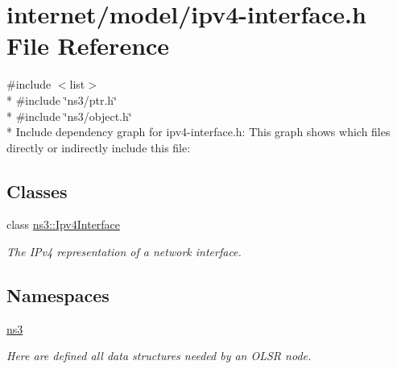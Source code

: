 \hypertarget{ipv4-interface_8h}{}\section{internet/model/ipv4-\/interface.h File Reference}
\label{ipv4-interface_8h}
{\ttfamily \#include $<$list$>$}\\*
{\ttfamily \#include \char`\"{}ns3/ptr.\+h\char`\"{}}\\*
{\ttfamily \#include \char`\"{}ns3/object.\+h\char`\"{}}\\*
Include dependency graph for ipv4-\/interface.h\+:
This graph shows which files directly or indirectly include this file\+:
\subsection*{Classes}
\begin{DoxyCompactItemize}
\item 
class \hyperlink{classns3_1_1Ipv4Interface}{ns3\+::\+Ipv4\+Interface}
\begin{DoxyCompactList}\small\item\em The I\+Pv4 representation of a network interface. \end{DoxyCompactList}\end{DoxyCompactItemize}
\subsection*{Namespaces}
\begin{DoxyCompactItemize}
\item 
 \hyperlink{namespacens3}{ns3}
\begin{DoxyCompactList}\small\item\em Here are defined all data structures needed by an O\+L\+SR node. \end{DoxyCompactList}\end{DoxyCompactItemize}
